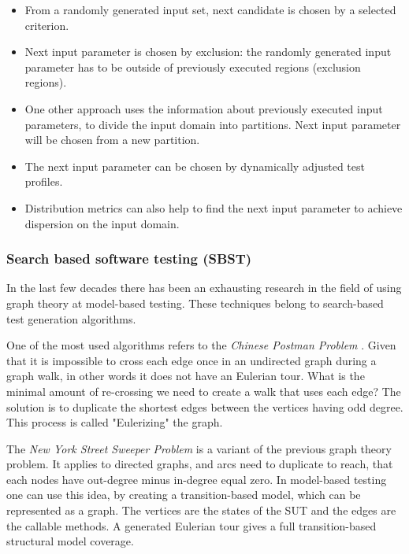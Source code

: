 \begin{itemize}
	\item From a randomly generated input set, next candidate is chosen by a selected criterion.
	\item Next input parameter is chosen by exclusion: the randomly generated input parameter has to be outside of previously executed regions (exclusion regions).
	\item One other approach uses the information about previously executed input parameters, to divide the input domain into partitions. Next input parameter will be chosen from a new partition.
	\item The next input parameter can be chosen by dynamically adjusted test profiles.
	\item Distribution metrics can also help to find the next input parameter to achieve dispersion on the input domain.
\end{itemize}


\subsubsection{Search based software testing (SBST)}
\label{ssub:searchbasedtestgen}

In the last few decades there has been an exhausting research in the field of using graph theory at model-based testing. These techniques belong to search-based test generation algorithms.

One of the most used algorithms refers to the \textit{Chinese Postman Problem} \cite{graphtheorymbt}. Given that it is impossible to cross each edge once in an undirected graph during a graph walk, in other words it does not have an Eulerian tour. What is the minimal amount of re-crossing we need to create a walk that uses each edge? The solution is to duplicate the shortest edges between the vertices having odd degree. This process is called "Eulerizing" the graph.

The \textit{New York Street Sweeper Problem} is a variant of the previous graph theory problem. It applies to directed graphs, and arcs need to duplicate to reach, that each nodes have out-degree minus in-degree equal zero. In model-based testing one can use this idea, by creating a transition-based model, which can be represented as a graph. The vertices are the states of the SUT and the edges are the callable methods. A generated Eulerian tour gives a full transition-based structural model coverage.

